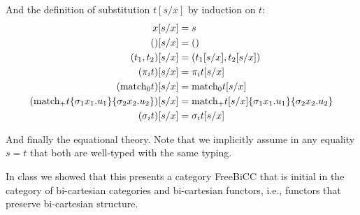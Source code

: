 \documentclass[12pt]{article}
\begin{document}
And the definition of substitution $t[s/x]$ by induction on $t$:
\begin{align*}
  x[s/x] &= s\\
  ()[s/x] &= ()\\
  (t_1,t_2)[s/x] &= (t_1[s/x], t_2[s/x])\\
  (\pi_i t)[s/x] &= \pi_i t[s/x]\\
  (\textrm{match}_0 t)[s/x] &= \textrm{match}_0 {t[s/x]}\\
  (\textrm{match}_+ {t}\{{\sigma_1 x_1. u_1}\}\{{\sigma_2 x_2. u_2}\})[s/x]  &= \textrm{match}_+ {t[s/x]}\{{\sigma_1 x_1. u_1}\}\{{\sigma_2 x_2. u_2}\}\\
  (\sigma_i t)[s/x] &= \sigma_i t[s/x]\\
\end{align*}

And finally the equational theory. Note that we implicitly assume in
any equality $s = t$ that both are well-typed with the same typing.

In class we showed that this presents a category FreeBiCC that is
initial in the category of bi-cartesian categories and bi-cartesian
functors, i.e., functors that preserve bi-cartesian structure.
\end{document}
